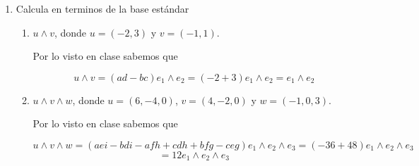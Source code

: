 \documentclass[letterpaper]{article}
\theoremstyle{definition}
\theoremstyle{lemathm}
\theoremstyle{lemademthm}
\newcommand{\R}{\mathbb{R}}
\begin{document}
\begin{enumerate}
\begin{proof}
			Por lo que concluimos que es lineal.

			Sea $u + N(T), v + N(T) \in \frac{\R^2}{N(T)}$ tales que
			
			\[\hat{T}(u + N(T)) = \hat{T}(v + N(T)),\]
			
			entonces

			\[T(u) = T(v)\]

			y

			\[T(u -v) = 0,\]

			por lo que

			\[u \sim v,\]

			por lo tanto

			\[u + N(T) = v + N(T).\]

			Por lo que concluimos que es inyectiva.

			Sea $\alpha \in F$, $u + N(T), v + N(T) \in \frac{\R^2}{N(T)}$, entonces

			\begin{align*}
				\hat{T}(\alpha(u + N(T)) + (v + N(T))) &= \hat{T}((\alpha u + v) + N(T))\\
				&= T(\alpha u + v)\\
				&= \alpha T(u) + T(v)\\
				&= \alpha\hat{T}(u+N(T)) + \hat{T}(v + N(T))
			\end{align*}

			Por lo que concluimos que es lineal.

			Sea $x \in R$ entonces podemos ver que $(x,0) \in \R^2, T((x,0)) = x$, por lo que $\hat{T}((x,0) + N(T)) = x$ por lo tanto es suprayectiva.

			Finalmente concluimos que es biyectiva.
		
		\end{proof}
		
		\item Calcula en terminos de la base estándar
		
		\begin{enumerate}
			\item $u \wedge v$, donde $u = (-2,3)$ y $v = (-1,1)$.
			
			Por lo visto en clase sabemos que

			\[u \wedge v = (ad-bc)e_1\wedge e_2 = (-2 + 3)e_1\wedge e_2 = e_1\wedge e_2\]
		
			\item $u \wedge v \wedge w$, donde $u = (6, -4, 0)$, $v = (4, -2, 0)$ y $w = (-1,0,3)$.
			
			Por lo visto en clase sabemos que

			\[u \wedge v \wedge w = (aei - bdi - afh + cdh + bfg - ceg)e_1\wedge e_2\wedge e_3 = (-36 + 48)e_1\wedge e_2\wedge e_3\]\[= 12e_1\wedge e_2\wedge e_3\]
		\end{enumerate}

	\end{enumerate}

	
\end{document}

